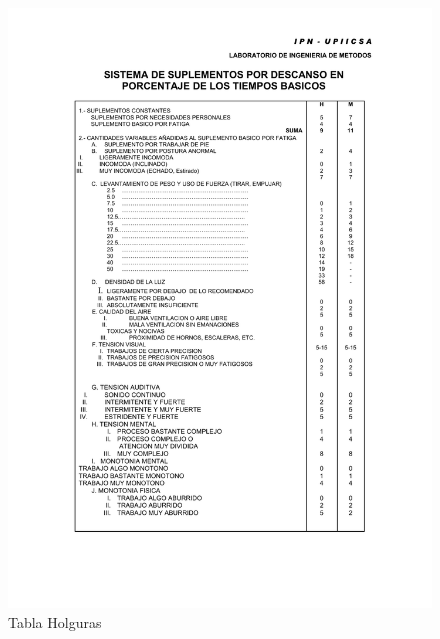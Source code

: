     \begin{figure}[H]
        \centering
        \includegraphics[scale=0.181]{21/img/tablaHolguras.pdf}
        \caption{Tabla Holguras}
        \label{fig:tablaHolguras}
    \end{figure}
    
    
    
